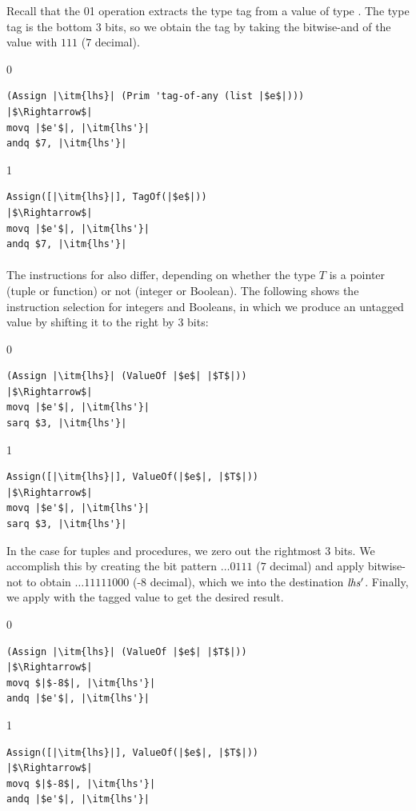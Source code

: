 \documentclass[7x10]{TimesAPriori_MIT}%
\def\racketEd{0}
\def\pythonEd{1}
\def\edition{1}
\newcommand{\racket}[1]{{\if\edition\racketEd{#1}\fi}}
\newcommand{\pythonColor}[0]{}
\newcommand{\python}[1]{{\if\edition\pythonEd\pythonColor #1\fi}}
\numberwithin{theorem}{chapter}
\numberwithin{definition}{chapter}
\numberwithin{equation}{chapter}
\begin{document}
Recall that the \racket{}\python{}
operation extracts the type tag from a value of type \ANYTY{}. The
type tag is the bottom $3$ bits, so we obtain the tag by taking the
bitwise-and of the value with $111$ ($7$ decimal).
%
{\if\edition\racketEd
\begin{lstlisting}
(Assign |\itm{lhs}| (Prim 'tag-of-any (list |$e$|)))
|$\Rightarrow$|
movq |$e'$|, |\itm{lhs'}|
andq $7, |\itm{lhs'}|
\end{lstlisting}
\fi}
%
{\if\edition\pythonEd\pythonColor
\begin{lstlisting}
Assign([|\itm{lhs}|], TagOf(|$e$|))
|$\Rightarrow$|
movq |$e'$|, |\itm{lhs'}|
andq $7, |\itm{lhs'}|
\end{lstlisting}
\fi}


\paragraph{}

The instructions for  also differ, depending on whether
the type $T$ is a pointer (tuple or function) or not (integer or
Boolean). The following shows the instruction
selection for integers and
Booleans, in which we produce an untagged value by shifting it to the
right by 3 bits:
%
{\if\edition\racketEd
\begin{lstlisting}
(Assign |\itm{lhs}| (ValueOf |$e$| |$T$|))
|$\Rightarrow$|
movq |$e'$|, |\itm{lhs'}|
sarq $3, |\itm{lhs'}|
\end{lstlisting}
\fi}
%
{\if\edition\pythonEd\pythonColor
\begin{lstlisting}
Assign([|\itm{lhs}|], ValueOf(|$e$|, |$T$|))
|$\Rightarrow$|
movq |$e'$|, |\itm{lhs'}|
sarq $3, |\itm{lhs'}|
\end{lstlisting}
\fi}
%
In the case for tuples and procedures, we zero out the rightmost 3
bits. We accomplish this by creating the bit pattern $\ldots 0111$
($7$ decimal) and apply bitwise-not to obtain $\ldots 11111000$ (-8
decimal), which we  into the destination $\mathit{lhs'}$.
Finally, we apply  with the tagged value to get the desired
result.
%
{\if\edition\racketEd
\begin{lstlisting}
(Assign |\itm{lhs}| (ValueOf |$e$| |$T$|))
|$\Rightarrow$|
movq $|$-8$|, |\itm{lhs'}|
andq |$e'$|, |\itm{lhs'}|
\end{lstlisting}
\fi}
%
{\if\edition\pythonEd\pythonColor
\begin{lstlisting}
Assign([|\itm{lhs}|], ValueOf(|$e$|, |$T$|))
|$\Rightarrow$|
movq $|$-8$|, |\itm{lhs'}|
andq |$e'$|, |\itm{lhs'}|
\end{lstlisting}
\fi}
\end{document}
